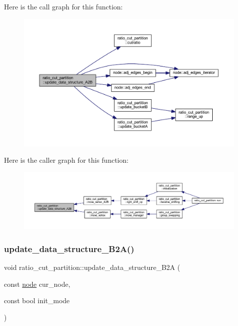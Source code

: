 Here is the call graph for this function\+:\nopagebreak
\begin{figure}[H]
\begin{center}
\leavevmode
\includegraphics[width=350pt]{classratio__cut__partition_acdb4b69b6c94f06f6997ccec296a281f_cgraph}
\end{center}
\end{figure}
Here is the caller graph for this function\+:\nopagebreak
\begin{figure}[H]
\begin{center}
\leavevmode
\includegraphics[width=350pt]{classratio__cut__partition_acdb4b69b6c94f06f6997ccec296a281f_icgraph}
\end{center}
\end{figure}
\mbox{\label{classratio__cut__partition_a942a3a035f59f2ab0d1d62da3c878eb8}} 
\subsubsection{\texorpdfstring{update\+\_\+data\+\_\+structure\+\_\+\+B2\+A()}{update\_data\_structure\_B2A()}}
{\footnotesize\ttfamily void ratio\+\_\+cut\+\_\+partition\+::update\+\_\+data\+\_\+structure\+\_\+\+B2A (\begin{DoxyParamCaption}\item[{const \mbox{\hyperlink{classnode}{node}}}]{cur\+\_\+node,  }\item[{const bool}]{init\+\_\+mode }\end{DoxyParamCaption})\hspace{0.3cm}{\ttfamily [protected]}}



